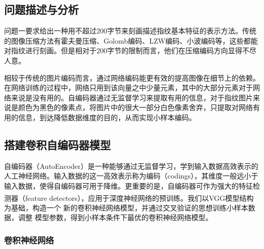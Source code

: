 \documentclass{whutmod}
\newcommand{\upcite}[1]{\textsuperscript{\cite{#1}}}
\begin{document}
		\subsection{问题描述与分析}
			问题一要求给出一种用不超过200字节来刻画描述指纹基本特征的表示方法。传统的图像压缩方法有霍夫曼压缩、Golomb编码、LZW编码、小波编码等，这些都能对指纹进行刻画。但是相对于200字节的限制而言，他们在压缩编码方向显得不尽人意。
			
			相较于传统的图片编码而言，通过网络编码能更有效的提高图像在细节上的依赖。在网络训练的过程中，网络只用到该向量之中少量元素，其中的大部分元素对于网络来说是没有用的。自编码器通过无监督学习来提取有用的信息，对于指纹图片来说是颜色为黑色的像素点，将图片中的很大一部分白色像素舍弃，只提取对网络有用的信息，到达降低数据维度的目的，从而实现小样本编码。
		
%			
		\subsection{搭建卷积自编码器模型}
		   自编码器（AutoEncoder）是一种能够通过无监督学习，学到输入数据高效表示的人工神经网络。输入数据的这一高效表示称为编码（codings），其维度一般远小于输入数据，使得自编码器可用于降维。更重要的是，自编码器可作为强大的特征检测器（feature detectors），应用于深度神经网络的预训练。我们以VGG模型\upcite{4}结构为基础，构造一个 新的卷积神经网络模型，并通过交叉验证的思想训练小样本数据，调整
		   模型参数，得到小样本条件下最优的卷积神经网络模型。
		
			\subsubsection{卷积神经网络}
			
\end{document}
